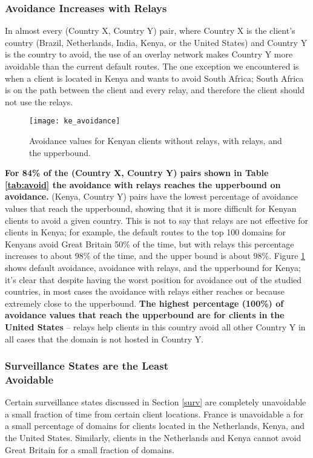 \subsubsection{Avoidance Increases with Relays}
In almost every (Country X, Country Y) pair, where Country X is the client's country (Brazil, Netherlands, India, Kenya, or the United States) and Country Y is the country to avoid, the use of an overlay network makes Country Y more avoidable than the current default routes.  The one exception we encountered is when a client is located in Kenya and wants to avoid South Africa; South Africa is on the path between the client and every relay, and therefore the client should not use the relays.  

\begin{figure}
\centering
\texttt{[image: ke\_avoidance]}
\caption{Avoidance values for Kenyan clients without relays, with relays, and the upperbound.}
\label{fig:ke_avoidance}
\end{figure}

{\bf For 84\% of the (Country X, Country Y) pairs shown in Table \ref{tab:avoid} the avoidance with relays reaches the upperbound on avoidance.}  (Kenya, Country Y) pairs have the lowest percentage of avoidance values that reach the upperbound, showing that it is more difficult for Kenyan clients to avoid a given country.  This is not to say that relays are not effective for clients in Kenya; for example, the default routes to the top 100 domains for Kenyans avoid Great Britain 50\% of the time, but with relays this percentage increases to about 98\% of the time, and the upper bound is about 98\%. Figure \ref{fig:ke_avoidance} shows default avoidance, avoidance with relays, and the upperbound for Kenya; it's clear that despite having the worst position for avoidance out of the studied countries, in most cases the avoidance with relays either reaches or because extremely close to the upperbound.  {\bf The highest percentage (100\%) of avoidance values that reach the upperbound are for clients in the United States} -- relays help clients in this country avoid all other Country Y in all cases that the domain is not hosted in Country Y.  

\subsubsection{Surveillance States are the Least \\Avoidable}
Certain surveillance states discussed in Section \ref{surv} are completely unavoidable a small fraction of time from certain client locations.  France is unavoidable a for a small percentage of domains for clients located in the Netherlands, Kenya, and the United States.  Similarly, clients in the Netherlands and Kenya cannot avoid Great Britain for a small fraction of domains.  

